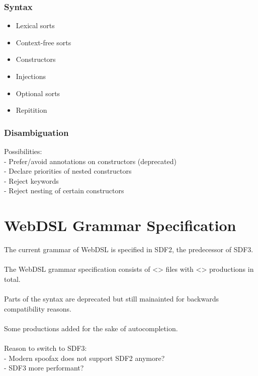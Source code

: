      \subsubsection{\label{subsubsec:sdf3-syntax}Syntax}

        \begin{itemize}
          \item Lexical sorts
          \item Context-free sorts
          \item Constructors
          \item Injections
          \item Optional sorts
          \item Repitition
        \end{itemize}

      \subsubsection{\label{subsubsec:sdf3-disambiguation}Disambiguation}

        Possibilities:
        \\- Prefer/avoid annotations on constructors (deprecated)
        \\- Declare priorities of nested constructors
        \\- Reject keywords
        \\- Reject nesting of certain constructors

  \section{\label{sec:webdsl-grammar}WebDSL Grammar Specification}

    The current grammar of WebDSL is specified in SDF2, the predecessor of SDF3.
    \\\\The WebDSL grammar specification consists of <> files with <> productions in total.
    \\\\Parts of the syntax are deprecated but still mainainted for backwards compatibility reasons.
    \\\\Some productions added for the sake of autocompletion.
    \\\\Reason to switch to SDF3:
    \\- Modern spoofax does not support SDF2 anymore?
    \\- SDF3 more performant?

